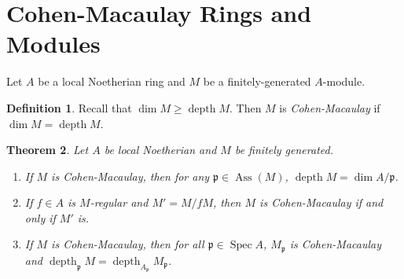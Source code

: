 \documentclass[leqno, openany]{memoir}
\newtheorem{thm}{Theorem}[section]
\theoremstyle{definition}
\newtheorem{defn}[thm]{Definition}
\theoremstyle{remark}
\theoremstyle{plain}
\theoremstyle{definition}
\theoremstyle{remark}
\newcommand{\mf}[1]{\mathfrak{#1}}
\DeclareMathOperator{\Spec}{Spec}
\DeclareMathOperator{\Ass}{Ass}
\DeclareMathOperator{\dpth}{depth}
\begin{document}
\section{Cohen-Macaulay Rings and Modules}%
\label{sec:cohen_macaulay_rings_and_modules}

Let $A$ be a local Noetherian ring and $M$ be a finitely-generated $A$-module. 

\begin{defn}
    Recall that $\dim M \geq \dpth M$. Then $M$ is \textit{Cohen-Macaulay} if $\dim M = \dpth M$. 
\end{defn}

\begin{thm}
    Let $A$ be local Noetherian and $M$ be finitely generated.
    \begin{enumerate}
        \item If $M$ is Cohen-Macaulay, then for any $\mf{p} \in \Ass(M)$, $\dpth M = \dim A/\mf{p}$.
        \item If $f \in A$ is $M$-regular and $M' = M/fM$, then $M$ is Cohen-Macaulay if and only if $M'$ is.
        \item If $M$ is Cohen-Macaulay, then for all $\mf{p} \in \Spec A$, $M_{\mf{p}}$ is Cohen-Macaulay and $\dpth_{\mf{p}} M = \dpth_{A_{\mf{p}}} M_{\mf{p}}$.
    \end{enumerate}
\end{thm}
\end{document}
